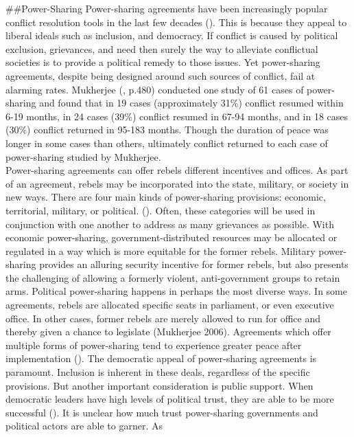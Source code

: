 \documentclass[11pt,]{article}
\begin{document}
\#\#Power-Sharing Power-sharing agreements have been increasingly
popular conflict resolution tools in the last few decades
(\citet{ottmann_power-sharing_201}). This is because they appeal to
liberal ideals such as inclusion, and democracy. If conflict is caused
by political exclusion, grievances, and need then surely the way to
alleviate conflictual societies is to provide a political remedy to
those issues. Yet power-sharing agreements, despite being designed
around such sources of conflict, fail at alarming rates. Mukherjee
(\citet{mukherjee_why_2006}, p.480) conducted one study of 61 cases of
power-sharing and found that in 19 cases (approximately 31\%) conflict
resumed within 6-19 months, in 24 cases (39\%) conflict resumed in 67-94
months, and in 18 cases (30\%) conflict returned in 95-183 months.
Though the duration of peace was longer in some cases than others,
ultimately conflict returned to each case of power-sharing studied by
Mukherjee.\\
Power-sharing agreements can offer rebels different incentives and
offices. As part of an agreement, rebels may be incorporated into the
state, military, or society in new ways. There are four main kinds of
power-sharing provisions: economic, territorial, military, or political.
(\citet{hartzell_institutionalizing_2008}). Often, these categories will
be used in conjunction with one another to address as many grievances as
possible. With economic power-sharing, government-distributed resources
may be allocated or regulated in a way which is more equitable for the
former rebels. Military power-sharing provides an alluring security
incentive for former rebels, but also presents the challenging of
allowing a formerly violent, anti-government groups to retain arms.
Political power-sharing happens in perhaps the most diverse ways. In
some agreements, rebels are allocated specific seats in parliament, or
even executive office. In other cases, former rebels are merely allowed
to run for office and thereby given a chance to legislate (Mukherjee
2006). Agreements which offer multiple forms of power-sharing tend to
experience greater peace after implementation
(\citet{hartzell_institutionalizing_2008}). The democratic appeal of
power-sharing agreements is paramount. Inclusion is inherent in these
deals, regardless of the specific provisions. But another important
consideration is public support. When democratic leaders have high
levels of political trust, they are able to be more successful
(\citet{wang_political_nodate}). It is unclear how much trust
power-sharing governments and political actors are able to garner. As
\end{document}
